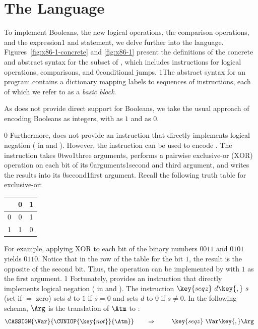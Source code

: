 \documentclass[7x10]{TimesAPriori_MIT}%
\def\racketEd{0}
\def\pythonEd{1}
\def\edition{1}
\def\xeightysixEd{0}
\def\riscvEd{1}
\def\architecture{1}
\newcommand\ifriscv[1]{\if\architecture\riscvEd{#1}\fi}
\newcommand\ifxeightsix[1]{\if\architecture\xeightysixEd{#1}\fi}
\newcommand{\racket}[1]{{\if\edition\racketEd{#1}\fi}}
\newcommand{\pythonColor}[0]{}
\newcommand{\python}[1]{{\if\edition\pythonEd\pythonColor #1\fi}}
\numberwithin{theorem}{chapter}
\numberwithin{definition}{chapter}
\numberwithin{equation}{chapter}
\begin{document}
\section{The \LangXIf{} Language}
\label{sec:x86-if}

To implement Booleans, the new logical operations, the
comparison operations, and the  expression\python{ and
  statement}, we delve further into the {\ArchName}
language. Figures~\ref{fig:x86-1-concrete} and \ref{fig:x86-1} present
the definitions of the concrete and abstract syntax for the \LangXIf{}
subset of {\ArchName}, which includes instructions for logical operations,
comparisons, and \racket{conditional} jumps.
%
\python{The abstract syntax for an \LangXIf{} program contains a
  dictionary mapping labels to sequences of instructions, each of
  which we refer to as a \emph{basic block}\index{subject}{basic
    block}.}

As {\ArchName} does not provide direct support for Booleans, we take the usual
approach of encoding Booleans as integers, with  as $1$ and
 as $0$.

\if\architecture\xeightysixEd
Furthermore, {\ArchName} does not provide an instruction that directly
implements logical negation ( in \LangIf{} and \LangCIf{}).
However, the \IXOR{} instruction can be used to encode .
The \IXOR{} instruction takes \ifxeightsix{two}\ifriscv{three} arguments, performs a pairwise
exclusive-or ($\mathrm{XOR}$) operation on each bit of its
\ifxeightsix{arguments}\ifriscv{second and third argument},
and writes the results into its \ifxeightsix{second}\ifriscv{first} argument.  Recall the following
truth table for exclusive-or:
\begin{center}
\begin{tabular}{l|cc}
   & 0 & 1 \\ \hline
0  & 0 & 1 \\
1  & 1 & 0
\end{tabular}
\end{center}
For example, applying $\mathrm{XOR}$ to each bit of the binary numbers
$0011$ and $0101$ yields $0110$. Notice that in the row of the table
for the bit $1$, the result is the opposite of the second bit.  Thus,
the  operation can be implemented by \IXOR{} with $1$ as
the first argument.
\fi
\if\architecture\riscvEd
Fortunately, {\ArchName} provides an instruction that directly
implements logical negation ( in \LangIf{} and \LangCIf{}).
The instruction $\key{seqz}~d\key{,}~s$ (set if $=$ zero) sets $d$ to $1$ if $s=0$ and
sets $d$ to $0$ if $s\ne0$.
\fi
In the following schema, $\Arg$ is the translation of
$\Atm$ to {\ArchName}:
\[
\CASSIGN{\Var}{\CUNIOP{\key{not}}{\Atm}}
\qquad\Rightarrow\qquad
\if\architecture\xeightysixEd
\begin{array}{l}
\key{movq}~ \Arg\key{,} \Var\\
\key{xorq}~ \key{\$1,} \Var
\end{array}
\fi
\if\architecture\riscvEd
\begin{array}{l}
\key{seqz}~ \Var\key{,} \Arg
\end{array}
\fi
\]
\end{document}
